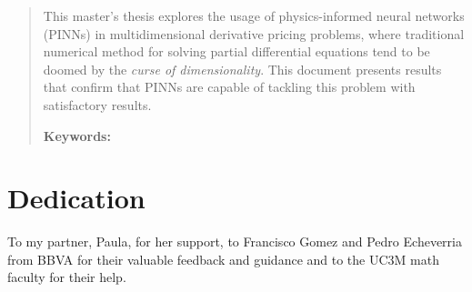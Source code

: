 \documentclass[12pt]{report} %
\theoremstyle{plain}           %
\theoremstyle{definition}      %
\theoremstyle{remark}          %
\begin{document}
\newpage %
\thispagestyle{empty}
\mbox{}

\renewcommand\abstractname{\large\bfseries\filcenter\uppercase{Summary}}
\begin{abstract}
\thispagestyle{plain}
\setcounter{page}{3}
	

This master's thesis explores the usage of physics-informed neural networks (PINNs) in 
multidimensional derivative pricing problems, where traditional numerical method for 
solving partial differential equations tend to be doomed by the \textit{curse of dimensionality}. This 
document presents results that confirm that PINNs are capable of tackling this problem with 
satisfactory results.
	
	\textbf{Keywords:} %
	
	\vfill
\end{abstract}
	\newpage %
	\thispagestyle{empty}
	\mbox{}


\chapter*{Dedication}

\setcounter{page}{5}
	
    To my partner, Paula, for her support, to Francisco Gomez and Pedro Echeverria from BBVA for their valuable feedback and guidance and to the UC3M math faculty for their help.
	\vfill
	
	\newpage %
	\thispagestyle{empty}
	\mbox{}
	


\tableofcontents
\thispagestyle{fancy}

\newpage %
\thispagestyle{empty}
\mbox{}

\listoffigures
\thispagestyle{fancy}

\newpage %
\thispagestyle{empty}
\mbox{}

\listoftables
\thispagestyle{fancy}

\newpage %
\thispagestyle{empty}
\mbox{}


\clearpage
{} %
\end{document}
